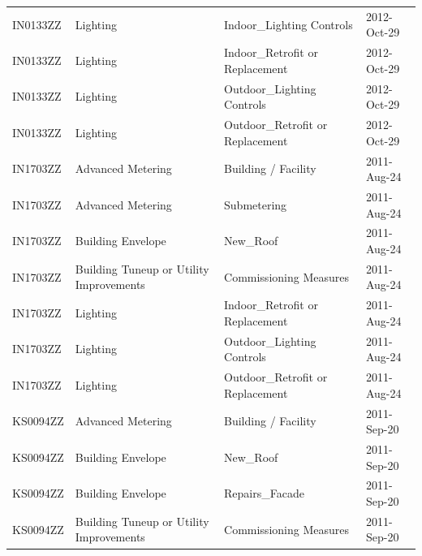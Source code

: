 \documentclass[12pt]{article}
\begin{document}
\begin{longtable}{lp{4cm}p{4cm}p{3cm}}
IN0133ZZ         & Lighting                                & Indoor\_Lighting Controls                 & 2012-Oct-29                   \\
IN0133ZZ         & Lighting                                & Indoor\_Retrofit or Replacement           & 2012-Oct-29                   \\
IN0133ZZ         & Lighting                                & Outdoor\_Lighting Controls                & 2012-Oct-29                   \\
IN0133ZZ         & Lighting                                & Outdoor\_Retrofit or Replacement          & 2012-Oct-29                   \\
IN1703ZZ         & Advanced Metering                       & Building / Facility                       & 2011-Aug-24                   \\
IN1703ZZ         & Advanced Metering                       & Submetering                               & 2011-Aug-24                   \\
IN1703ZZ         & Building Envelope                       & New\_Roof                                 & 2011-Aug-24                   \\
IN1703ZZ         & Building Tuneup or Utility Improvements & Commissioning Measures                    & 2011-Aug-24                   \\
IN1703ZZ         & Lighting                                & Indoor\_Retrofit or Replacement           & 2011-Aug-24                   \\
IN1703ZZ         & Lighting                                & Outdoor\_Lighting Controls                & 2011-Aug-24                   \\
IN1703ZZ         & Lighting                                & Outdoor\_Retrofit or Replacement          & 2011-Aug-24                   \\
KS0094ZZ         & Advanced Metering                       & Building / Facility                       & 2011-Sep-20                   \\
KS0094ZZ         & Building Envelope                       & New\_Roof                                 & 2011-Sep-20                   \\
KS0094ZZ         & Building Envelope                       & Repairs\_Facade                           & 2011-Sep-20                   \\
KS0094ZZ         & Building Tuneup or Utility Improvements & Commissioning Measures                    & 2011-Sep-20                   \\

\end{longtable}
\end{document}
